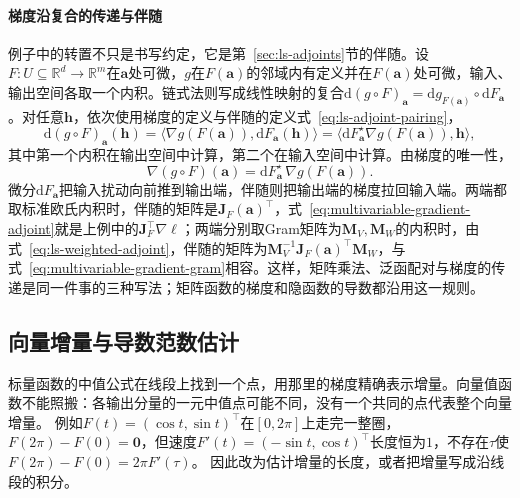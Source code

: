 \paragraph{梯度沿复合的传递与伴随}
例子中的转置不只是书写约定，它是第~\ref{sec:ls-adjoints}节的伴随。设$F:U\subseteq\mathbb R^d\to\mathbb R^m$在$\bm a$处可微，$g$在$F(\bm a)$的邻域内有定义并在$F(\bm a)$处可微，输入、输出空间各取一个内积。链式法则写成线性映射的复合$\mathrm d(g\circ F)_{\bm a}=\mathrm dg_{F(\bm a)}\circ\mathrm dF_{\bm a}$。对任意$\bm h$，依次使用梯度的定义与伴随的定义式~\eqref{eq:ls-adjoint-pairing}，
\[
 \mathrm d(g\circ F)_{\bm a}(\bm h)
 =\bigl\langle\nabla g(F(\bm a)),\mathrm dF_{\bm a}(\bm h)\bigr\rangle
 =\bigl\langle\mathrm dF_{\bm a}^\star\nabla g(F(\bm a)),\bm h\bigr\rangle,
\]
其中第一个内积在输出空间中计算，第二个在输入空间中计算。由梯度的唯一性，
\begin{equation}
 \nabla(g\circ F)(\bm a)=\mathrm dF_{\bm a}^\star\,\nabla g(F(\bm a)).
\label{eq:multivariable-gradient-adjoint}
\end{equation}
微分$\mathrm dF_{\bm a}$把输入扰动向前推到输出端，伴随则把输出端的梯度拉回输入端。两端都取标准欧氏内积时，伴随的矩阵是$\bm J_F(\bm a)^\top$，式~\eqref{eq:multivariable-gradient-adjoint}就是上例中的$\bm J_F^\top\nabla\ell$；两端分别取Gram矩阵为$\bm M_V,\bm M_W$的内积时，由式~\eqref{eq:ls-weighted-adjoint}，伴随的矩阵为$\bm M_V^{-1}\bm J_F(\bm a)^\top\bm M_W$，与式~\eqref{eq:multivariable-gradient-gram}相容。这样，矩阵乘法、泛函配对与梯度的传递是同一件事的三种写法；矩阵函数的梯度和隐函数的导数都沿用这一规则。

\subsection{向量增量与导数范数估计}
\label{sec:multivariable-vector-increment-bound}

标量函数的中值公式在线段上找到一个点，用那里的梯度精确表示增量。向量值函数不能照搬：各输出分量的一元中值点可能不同，没有一个共同的点代表整个向量增量。
例如$F(t)=(\cos t,\sin t)^\top$在$[0,2\pi]$上走完一整圈，$F(2\pi)-F(0)=\bm 0$，但速度$F'(t)=(-\sin t,\cos t)^\top$长度恒为$1$，不存在$\tau$使$F(2\pi)-F(0)=2\pi F'(\tau)$。
因此改为估计增量的长度，或者把增量写成沿线段的积分。

